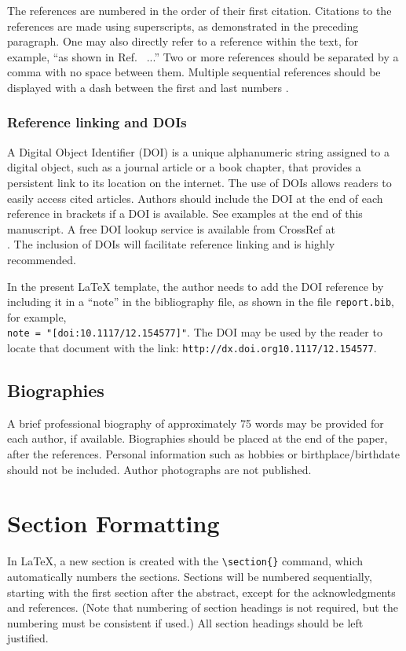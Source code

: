 \documentclass[12pt]{spieman}  %
\begin{document}
\begin{spacing}{2}
The references are numbered in the order of their first citation. Citations to the references are made using superscripts, as demonstrated in the preceding paragraph. One may also directly refer to a reference within the text, for example, ``as shown in Ref.~ ...''  Two or more references should be separated by a comma with no space between them. Multiple sequential references should be displayed with a dash between the first and last numbers .

\subsubsection{Reference linking and DOIs}
A Digital Object Identifier (DOI) is a unique alphanumeric string assigned to a digital object, such as a journal article or a book chapter, that provides a persistent link to its location on the internet. The use of DOIs allows readers to easily access cited articles. Authors should include the DOI at the end of each reference in brackets if a DOI is available. See examples at the end of this manuscript. A free DOI lookup service is available from CrossRef at \\. The inclusion of DOIs will facilitate reference linking and is highly recommended.

In the present LaTeX template, the author needs to add the DOI reference by including it in a ``note'' in the bibliography file, as shown in the file {\verb+report.bib+}, for example, \\ {\verb+note = "[doi:10.1117/12.154577]"+}. The DOI may be used by the reader to locate that document with the link: {\verb+http://dx.doi.org10.1117/12.154577+}.

\subsection{Biographies}
A brief professional biography of approximately 75 words may be provided for each author, if available. Biographies should be placed at the end of the paper, after the references. Personal information such as hobbies or birthplace/birthdate should not be included. Author photographs are not published.

\section{Section Formatting}
\label{sect:sections}
In LaTeX, a new section is created with the \verb|\section{}| command, which automatically numbers the sections. Sections will be numbered sequentially, starting with the first section after the abstract, except for the acknowledgments and references. (Note that numbering of section headings is not required, but the numbering must be consistent if used.) All section headings should be left justified.


\end{spacing}
\end{document}
